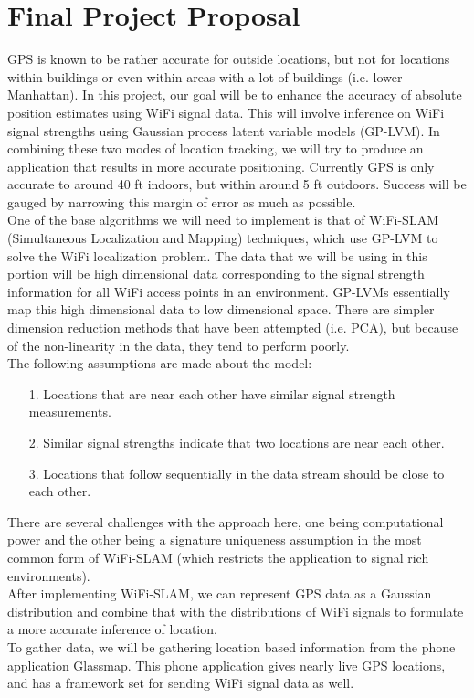 \documentclass[letterpaper, 11pt]{article}
\theoremstyle{definition}
\theoremstyle{remark}
\newcounter{prob_num}
\begin{document}
\section*{Final Project Proposal}

	GPS is known to be rather accurate for outside locations, but not for locations within buildings or even within areas with a lot of buildings (i.e. lower Manhattan). In this project, our goal will be to enhance the accuracy of absolute position estimates using WiFi signal data. This will involve inference on WiFi signal strengths using Gaussian process latent variable models (GP-LVM). In combining these two modes of location tracking, we will try to produce an application that results in more accurate positioning. Currently GPS is only accurate to around 40 ft indoors, but within around 5 ft outdoors. Success will be gauged by narrowing this margin of error as much as possible. \\ 

One of the base algorithms we will need to implement is that of WiFi-SLAM (Simultaneous Localization and Mapping) techniques, which use GP-LVM to solve the WiFi localization problem. The data that we will be using in this portion will be high dimensional data corresponding to the signal strength information for all WiFi access points in an environment. GP-LVMs essentially map this high dimensional data to low dimensional space. There are simpler dimension reduction methods that have been attempted (i.e. PCA), but because of the non-linearity in the data, they tend to perform poorly. \\

The following assumptions are made about the model: 

\begin{enumerate}
	\item[1.] Locations that are near each other have similar signal strength measurements. 
	\item[2.] Similar signal strengths indicate that two locations are near each other. 
	\item[3.] Locations that follow sequentially in the data stream should be close to each other. 
\end{enumerate}


There are several challenges with the approach here, one being computational power and the other being a signature uniqueness assumption in the most common form of WiFi-SLAM (which restricts the application to signal rich environments). \\

After implementing WiFi-SLAM, we can represent GPS data as a Gaussian distribution and combine that with the distributions of WiFi signals to formulate a more accurate inference of location. \\

To gather data, we will be gathering location based information from the phone application Glassmap. This phone application gives nearly live GPS locations, and has a framework set for sending WiFi signal data as well. 
\end{document}
